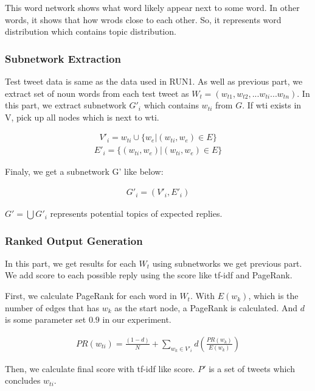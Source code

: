 \documentclass{../style/sig-alternate}
\begin{document}
This word network shows what word likely appear next to some word. In other words, it shows that how wrods close to each other. So, it represents word distribution which contains topic distribution.

\subsubsection{Subnetwork Extraction}
Test tweet data is same as the data used in RUN1. As well as previous part, we extract set of noun words from each test tweet as \(W_{t} = (w_{t1}, w_{t2}, ... w_{ti} ... w_{tn})\).
In this part, we extract subnetwork $G'_{i}$ which contains \(w_{ti}\) from $G$.
If wti exists in V, pick up all nodes which is next to wti.

\begin{eqnarray}V'_{i} = w_{ti} \cup \{w_{e} |  (w_{ti}, w_{e}) \in E\}\end{eqnarray}
\begin{eqnarray}E'_{i} = \{(w_{ti}, w_{e}) | (w_{ti}, w_{e}) \in E\} \end{eqnarray}

Finaly, we get a subnetwork G' like below:

\begin{eqnarray}G'_{i} = (V'_{i}, E'_{i})\end{eqnarray}

\(G' = \bigcup G'_{i}\) represents potential topics of expected replies.

\subsubsection{Ranked Output Generation}
In this part, we get results for each $W_{t}$ using subnetworks we get previous part. We add score to each possible reply using the score like tf-idf and PageRank\cite{PageRank}.

First, we calculate PageRank for each word in $W_{t}$. With $E(w_{k})$, which is the number of edges that has $w_{k}$ as the start node, a PageRank is calculated. And $d$ is some parameter set $0.9$ in our experiment.

\begin{eqnarray}PR(w_{ti}) = \frac{(1-d)}{N} + \sum_{w_{k}\in V'_{i}} d(\frac{PR(w_{k})}{E(w_{k})})\end{eqnarray}

Then, we calculate final score with tf-idf like score. $P'$ is a set of tweets which concludes $w_{ti}$. 
\end{document}
